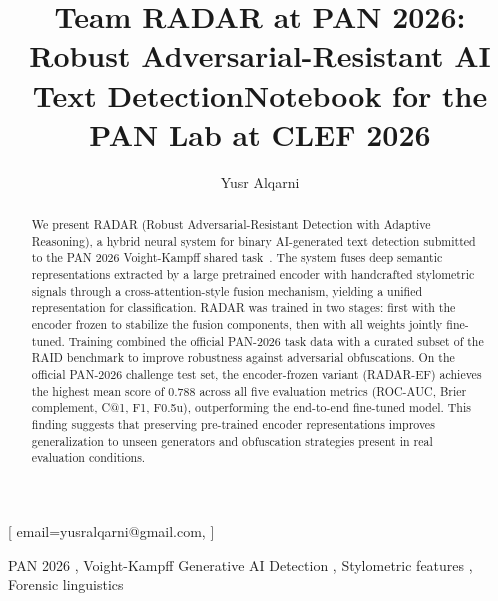 \documentclass[]{ceurart}
\begin{document}


\title{Team RADAR at PAN 2026: Robust Adversarial-Resistant AI Text Detection}
\title[mode=sub]{Notebook for the PAN Lab at CLEF 2026}

\author{Yusr Alqarni}[%
email=yusralqarni@gmail.com,
]

\address{Al-Baha University, Al-Baha, Saudi Arabia}

\begin{abstract}
We present RADAR (Robust Adversarial-Resistant Detection with Adaptive
Reasoning), a hybrid neural system for binary AI-generated text detection
submitted to the PAN 2026 Voight-Kampff shared task~\cite{bevendorff:2026b,bevendorff:2026c}.
The system fuses deep semantic representations extracted by a large
pretrained encoder with handcrafted stylometric signals through a
cross-attention-style fusion mechanism, yielding a unified representation
for classification. RADAR was trained in two stages: first with the encoder
frozen to stabilize the fusion components, then with all weights jointly
fine-tuned. Training combined the official PAN-2026 task data with a
curated subset of the RAID benchmark to improve robustness against
adversarial obfuscations. On the official PAN-2026 challenge test set, the
encoder-frozen variant (RADAR-EF) achieves the highest mean score of 0.788
across all five evaluation metrics (ROC-AUC, Brier complement, C@1, F1,
F0.5u), outperforming the end-to-end fine-tuned model. This finding
suggests that preserving pre-trained encoder representations improves
generalization to unseen generators and obfuscation strategies present in
real evaluation conditions.
\end{abstract}

\begin{keywords}
  PAN 2026 \sep
  Voight-Kampff Generative AI Detection \sep
  Stylometric features \sep
  Forensic linguistics
\end{keywords}
\end{document}
